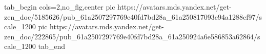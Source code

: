  
 
 
 
 


\ifcmt
  tab_begin cols=2,no_fig,center
     pic https://avatars.mds.yandex.net/get-zen_doc/5185626/pub_61a2507297769e40fd7bd28a_61a250817093e94a1288cf97/scale_1200
		 pic https://avatars.mds.yandex.net/get-zen_doc/222865/pub_61a2507297769e40fd7bd28a_61a250924a6e586853a62864/scale_1200
  tab_end
\fi
